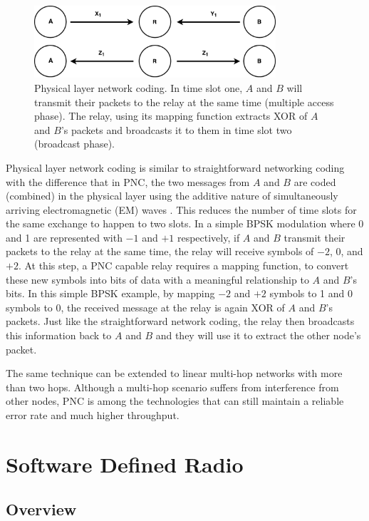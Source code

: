 \begin{figure} [th]
    \centering
    \includegraphics[width=0.8\textwidth]{figures/threeNodePnc.pdf}
    \caption{Physical layer network coding. In time slot one, $A$ and $B$ will transmit their packets to the relay at the same time (multiple access phase). The relay, using its mapping function extracts XOR of $A$ and $B$'s packets and broadcasts it to them in time slot two (broadcast phase).} \label{fig:threeNodePnc}
\end{figure}

Physical layer network coding is similar to straightforward networking coding with the difference that in PNC, the two messages from $A$ and $B$ are coded (combined) in the physical layer using the additive nature of simultaneously arriving electromagnetic (EM) waves \cite{zhang2006hot}. This reduces the number of time slots for the same exchange to happen to two slots. In a simple BPSK modulation where 0 and 1 are represented with $-1$ and $+1$ respectively, if $A$ and $B$ transmit their packets to the relay at the same time, the relay will receive symbols of $-2$, $0$, and $+2$. At this step, a PNC capable relay requires a mapping function, to convert these new symbols into bits of data with a meaningful relationship to $A$ and $B$'s bits. In this simple BPSK example, by mapping $-2$ and $+2$ symbols to 1 and $0$ symbols to 0, the received message at the relay is again XOR of $A$ and $B$'s packets. Just like the straightforward network coding, the relay then broadcasts this information back to $A$ and $B$ and they will use it to extract the other node's packet.

The same technique can be extended to linear multi-hop networks with more than two hops. Although a multi-hop scenario suffers from interference from other nodes, PNC is among the technologies that can still maintain a reliable error rate and much higher throughput.


\section{Software Defined Radio}

\subsection{Overview}

